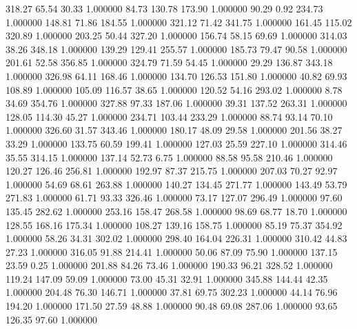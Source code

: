     318.27     65.54     30.33  1.000000
     84.73    130.78    173.90  1.000000
     90.29      0.92    234.73  1.000000
    148.81     71.86    184.55  1.000000
    321.12     71.42    341.75  1.000000
    161.45    115.02    320.89  1.000000
    203.25     50.44    327.20  1.000000
    156.74     58.15     69.69  1.000000
    314.03     38.26    348.18  1.000000
    139.29    129.41    255.57  1.000000
    185.73     79.47     90.58  1.000000
    201.61     52.58    356.85  1.000000
    324.79     71.59     54.45  1.000000
     29.29    136.87    343.18  1.000000
    326.98     64.11    168.46  1.000000
    134.70    126.53    151.80  1.000000
     40.82     69.93    108.89  1.000000
    105.09    116.57     38.65  1.000000
    120.52     54.16    293.02  1.000000
      8.78     34.69    354.76  1.000000
    327.88     97.33    187.06  1.000000
     39.31    137.52    263.31  1.000000
    128.05    114.30     45.27  1.000000
    234.71    103.44    233.29  1.000000
     88.74     93.14     70.10  1.000000
    326.60     31.57    343.46  1.000000
    180.17     48.09     29.58  1.000000
    201.56     38.27     33.29  1.000000
    133.75     60.59    199.41  1.000000
    127.03     25.59    227.10  1.000000
    314.46     35.55    314.15  1.000000
    137.14     52.73      6.75  1.000000
     88.58     95.58    210.46  1.000000
    120.27    126.46    256.81  1.000000
    192.97     87.37    215.75  1.000000
    207.03     70.27     92.97  1.000000
     54.69     68.61    263.88  1.000000
    140.27    134.45    271.77  1.000000
    143.49     53.79    271.83  1.000000
     61.71     93.33    326.46  1.000000
     73.17    127.07    296.49  1.000000
     97.60    135.45    282.62  1.000000
    253.16    158.47    268.58  1.000000
     98.69     68.77     18.70  1.000000
    128.55    168.16    175.34  1.000000
    108.27    139.16    158.75  1.000000
     85.19     75.37    354.92  1.000000
     58.26     34.31    302.02  1.000000
    298.40    164.04    226.31  1.000000
    310.42     44.83     27.23  1.000000
    316.05     91.88    214.41  1.000000
     50.06     87.09     75.90  1.000000
    137.15     23.59      0.25  1.000000
    201.88     84.26     73.46  1.000000
    190.33     96.21    328.52  1.000000
    119.24    147.09     59.09  1.000000
     73.00     45.31     32.91  1.000000
    345.88    144.44     42.35  1.000000
    204.48     76.30    146.71  1.000000
     37.81     69.75    302.23  1.000000
     44.14     76.96    194.20  1.000000
    171.50     27.59     48.88  1.000000
     90.48     69.08    287.06  1.000000
     93.65    126.35     97.60  1.000000
